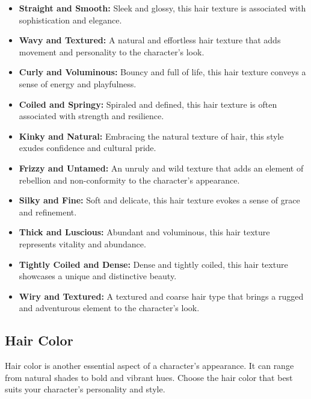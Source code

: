 \documentclass[12pt]{book}
\begin{document}
\begin{itemize}
    \item \textbf{Straight and Smooth:} Sleek and glossy, this hair texture is associated with sophistication and elegance.
    \item \textbf{Wavy and Textured:} A natural and effortless hair texture that adds movement and personality to the character's look.
    \item \textbf{Curly and Voluminous:} Bouncy and full of life, this hair texture conveys a sense of energy and playfulness.
    \item \textbf{Coiled and Springy:} Spiraled and defined, this hair texture is often associated with strength and resilience.
    \item \textbf{Kinky and Natural:} Embracing the natural texture of hair, this style exudes confidence and cultural pride.
    \item \textbf{Frizzy and Untamed:} An unruly and wild texture that adds an element of rebellion and non-conformity to the character's appearance.
    \item \textbf{Silky and Fine:} Soft and delicate, this hair texture evokes a sense of grace and refinement.
    \item \textbf{Thick and Luscious:} Abundant and voluminous, this hair texture represents vitality and abundance.
    \item \textbf{Tightly Coiled and Dense:} Dense and tightly coiled, this hair texture showcases a unique and distinctive beauty.
    \item \textbf{Wiry and Textured:} A textured and coarse hair type that brings a rugged and adventurous element to the character's look.
\end{itemize}

\subsection{\textbf{Hair Color}}

Hair color is another essential aspect of a character's appearance. It can range from natural shades to bold and vibrant hues. Choose the hair color that best suits your character's personality and style.
\end{document}
